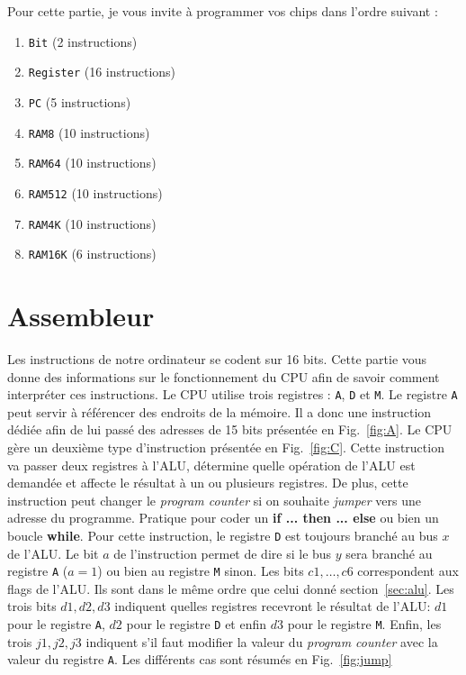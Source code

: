 \documentclass[11pt]{article}
\begin{document}
Pour cette partie, je vous invite à programmer vos chips dans l'ordre suivant :

\begin{enumerate}
\item \texttt{Bit} (2 instructions)
\item \texttt{Register} (16 instructions)
\item \texttt{PC} (5 instructions)
\item \texttt{RAM8} (10 instructions)
\item \texttt{RAM64} (10 instructions)
\item \texttt{RAM512} (10 instructions)
\item \texttt{RAM4K} (10 instructions)
\item \texttt{RAM16K} (6 instructions)
\end{enumerate}

\section{Assembleur}
\label{sec:assembly}

Les instructions de notre ordinateur se codent sur 16 bits. Cette partie vous donne des informations sur le fonctionnement du CPU afin de savoir comment interpréter ces instructions. Le CPU utilise trois registres : \texttt{A}, \texttt{D} et \texttt{M}. Le registre \texttt{A} peut servir à référencer des endroits de la mémoire. Il a donc une instruction dédiée afin de lui passé des adresses de 15 bits présentée en Fig.~\ref{fig:A}. Le CPU gère un deuxième type d'instruction présentée en Fig.~\ref{fig:C}. Cette instruction va passer deux registres à l'ALU, détermine quelle opération de l'ALU est demandée et affecte le résultat à un ou plusieurs registres. De plus, cette instruction peut changer le \textit{program counter} si on souhaite \textit{jumper} vers une adresse du programme. Pratique pour coder un \textbf{if ... then ... else} ou bien un boucle \textbf{while}. Pour cette instruction, le registre \texttt{D} est toujours branché au bus \(x\) de l'ALU. Le bit \(a\) de l'instruction permet de dire si le bus \(y\) sera branché au registre \texttt{A} (\(a=1\)) ou bien au registre \texttt{M} sinon. Les bits \(c1,\dots,c6\) correspondent aux flags de l'ALU. Ils sont dans le même ordre que celui donné section~\ref{sec:alu}. Les trois bits \(d1,d2,d3\) indiquent quelles registres recevront le résultat de l'ALU: \(d1\) pour le registre \texttt{A}, \(d2\) pour le registre \texttt{D} et enfin \(d3\) pour le registre \texttt{M}. Enfin, les trois \(j1,j2,j3\) indiquent s'il faut modifier la valeur du \textit{program counter} avec la valeur du registre \texttt{A}. Les différents cas sont résumés en Fig.~\ref{fig:jump}
\end{document}
